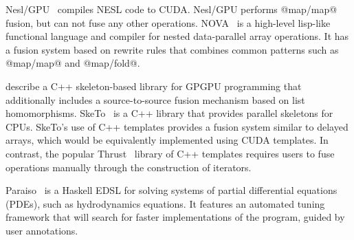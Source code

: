 Nesl/GPU~\cite{Bergstrom:2012bi} compiles NESL code to CUDA. Nesl/GPU performs
@map/map@ fusion, but can not fuse any other operations.
NOVA~\cite{Collins:2013wn} is a high-level lisp-like functional language and
compiler for nested data-parallel array operations. It has a fusion system based
on rewrite rules that combines common patterns such as @map/map@ and @map/fold@.

\citet{Sato:2009cq} describe a C++ skeleton-based library for GPGPU programming
that additionally includes a source-to-source fusion mechanism based on list
homomorphisms. SkeTo~\cite{Matsuzaki:2011ew} is a C++ library that provides
parallel skeletons for CPUs. SkeTo's use of C++ templates provides a fusion
system similar to delayed arrays, which would be equivalently implemented using
CUDA templates. In contrast, the popular Thrust~\cite{ThrustAParallelT:ub}
library of C++ templates requires users to fuse operations manually through the
construction of iterators.

Paraiso~\cite{Muranushi:2012eh} is a Haskell EDSL for solving systems of partial
differential equations (PDEs), such as hydrodynamics equations. It features an
automated tuning framework that will search for faster implementations of the
program, guided by user annotations.




